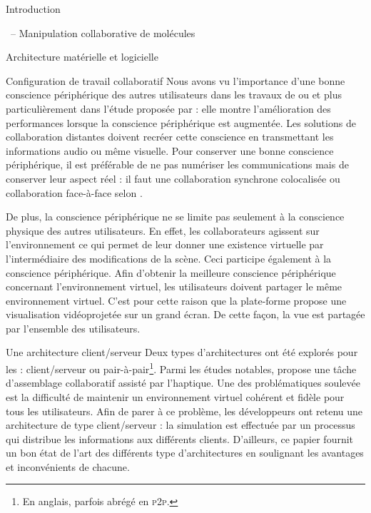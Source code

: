 \documentclass[myfrancais]{mythesis}
\begin{document}
\begin{mypart}{Introduction}
\begin{mychapter}{\myShaddock\ -- Manipulation collaborative de molécules}
\begin{mysection}{Architecture matérielle et logicielle}
\begin{mysubsection}{Configuration de travail collaboratif}
					Nous avons vu l'importance d'une bonne conscience périphérique des autres utilisateurs dans les travaux de  ou  et plus particulièrement dans l'étude proposée par  : elle montre l'amélioration des performances lorsque la conscience périphérique est augmentée.
					Les solutions de collaboration distantes doivent recréer cette conscience en transmettant les informations audio ou même visuelle.
					Pour conserver une bonne conscience périphérique, il est préférable de ne pas numériser les communications mais de conserver leur aspect réel : il faut une collaboration synchrone colocalisée ou collaboration face-à-face selon  .

					De plus, la conscience périphérique ne se limite pas seulement à la conscience physique des autres utilisateurs.
					En effet, les collaborateurs agissent sur l'environnement ce qui permet de leur donner une existence virtuelle par l'intermédiaire des modifications de la scène.
					Ceci participe également à la conscience périphérique.
					Afin d'obtenir la meilleure conscience périphérique concernant l'environnement virtuel, les utilisateurs doivent partager le même environnement virtuel.
					C'est pour cette raison que la plate-forme \myShaddock propose une visualisation vidéoprojetée sur un grand écran.
					De cette façon, la vue est partagée par l'ensemble des utilisateurs.
				\end{mysubsection}
				\begin{mysubsection}{Une architecture client/serveur}
					Deux types d'architectures ont été explorés pour les  : client/serveur ou pair-à-pair\footnote{En anglais,  parfois abrégé en \textsc{p2p}.}.
					Parmi les études notables,  propose une tâche d'assemblage collaboratif assisté par l'haptique.
					Une des problématiques soulevée est la difficulté de maintenir un environnement virtuel cohérent et fidèle pour tous les utilisateurs.
					Afin de parer à ce problème, les développeurs ont retenu une architecture de type client/serveur : la simulation est effectuée par un processus qui distribue les informations aux différents clients.
					D'ailleurs, ce papier fournit un bon état de l'art des différents type d'architectures en soulignant les avantages et inconvénients de chacune.


\end{mysubsection}
\end{mysection}
\end{mychapter}
\end{mypart}
\end{document}
